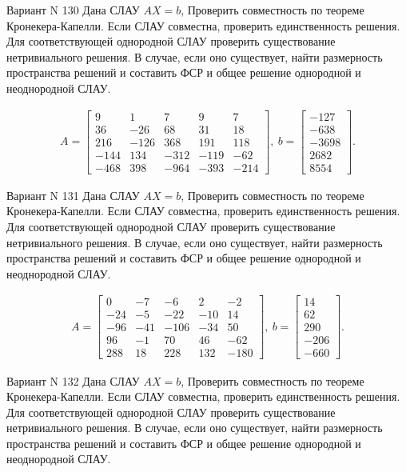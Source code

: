 \documentclass[11pt]{report}
\begin{document}
Вариант N 130
Дана СЛАУ $AX = b$,
Проверить совместность по теореме Кронекера-Капелли. Если СЛАУ совместна, проверить единственность решения.
Для соответствующей однородной СЛАУ проверить существование нетривиального решения. В случае, если оно существует,
найти размерность пространства решений и составить ФСР и общее решение однородной  и неоднородной СЛАУ.


\begin{align*}
 A = \left[\begin{matrix}9 & 1 & 7 & 9 & 7\\36 & -26 & 68 & 31 & 18\\216 & -126 & 368 & 191 & 118\\-144 & 134 & -312 & -119 & -62\\-468 & 398 & -964 & -393 & -214\end{matrix}\right],
\ b = \left[\begin{matrix}-127\\-638\\-3698\\2682\\8554\end{matrix}\right]. 
 \end{align*}

Вариант N 131
Дана СЛАУ $AX = b$,
Проверить совместность по теореме Кронекера-Капелли. Если СЛАУ совместна, проверить единственность решения.
Для соответствующей однородной СЛАУ проверить существование нетривиального решения. В случае, если оно существует,
найти размерность пространства решений и составить ФСР и общее решение однородной  и неоднородной СЛАУ.


\begin{align*}
 A = \left[\begin{matrix}0 & -7 & -6 & 2 & -2\\-24 & -5 & -22 & -10 & 14\\-96 & -41 & -106 & -34 & 50\\96 & -1 & 70 & 46 & -62\\288 & 18 & 228 & 132 & -180\end{matrix}\right],
\ b = \left[\begin{matrix}14\\62\\290\\-206\\-660\end{matrix}\right]. 
 \end{align*}

Вариант N 132
Дана СЛАУ $AX = b$,
Проверить совместность по теореме Кронекера-Капелли. Если СЛАУ совместна, проверить единственность решения.
Для соответствующей однородной СЛАУ проверить существование нетривиального решения. В случае, если оно существует,
найти размерность пространства решений и составить ФСР и общее решение однородной  и неоднородной СЛАУ.
\end{document}

